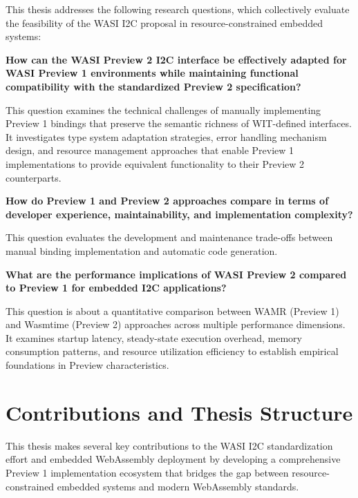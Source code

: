 This thesis addresses the following research questions, which collectively evaluate the feasibility of the WASI I2C proposal in resource-constrained embedded systems:

\begin{researchquestion}\label{rq1}
\textbf{How can the WASI Preview 2 I2C interface be effectively adapted for WASI Preview 1 environments while maintaining functional compatibility with the standardized Preview 2 specification?}
\end{researchquestion}

This question examines the technical challenges of manually implementing Preview 1 bindings that preserve the semantic richness of WIT-defined interfaces. It investigates type system adaptation strategies, error handling mechanism design, and resource management approaches that enable Preview 1 implementations to provide equivalent functionality to their Preview 2 counterparts.

\begin{researchquestion}\label{rq2}
\textbf{How do Preview 1 and Preview 2 approaches compare in terms of developer experience, maintainability, and implementation complexity?}
\end{researchquestion}

This question evaluates the development and maintenance trade-offs between manual binding implementation and automatic code generation.

\begin{researchquestion}\label{rq3}
\textbf{What are the performance implications of WASI Preview 2 compared to Preview 1 for embedded I2C applications?}
\end{researchquestion}

This question is about a quantitative comparison between WAMR (Preview 1) and Wasmtime (Preview 2) approaches across multiple performance dimensions. It examines startup latency, steady-state execution overhead, memory consumption patterns, and resource utilization efficiency to establish empirical foundations in Preview characteristics.




\section{Contributions and Thesis Structure}
\label{sec:contributions-structure}

This thesis makes several key contributions to the WASI I2C standardization effort and embedded WebAssembly deployment by developing a comprehensive Preview 1 implementation ecosystem that bridges the gap between resource-constrained embedded systems and modern WebAssembly standards.

